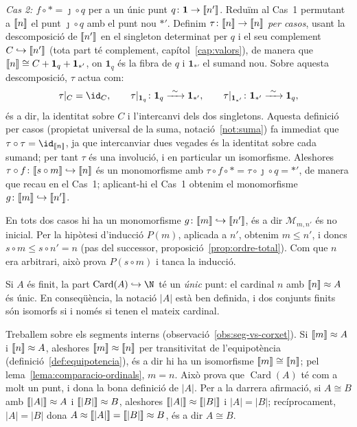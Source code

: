 \begin{prova}
\emph{Cas 2: \(f\circ\ast=\jmath\circ q\)} per a un únic punt
\(q\colon\mathbf1\to\llbracket n'\rrbracket\). Reduïm al Cas~1 permutant a \(\llbracket n\rrbracket\) el
punt \(\jmath\circ q\) amb el punt nou \(\ast'\). Definim
\(\tau\colon\llbracket n\rrbracket\to\llbracket n\rrbracket\) \emph{per casos}, usant la descomposició de
\(\llbracket n'\rrbracket\) en el singleton determinat per \(q\) i el seu complement
\(C\hookrightarrow\llbracket n'\rrbracket\) (tota part té complement,
capítol~\ref{cap:valors}), de manera que
\(\llbracket n\rrbracket\cong C+\mathbf1_q+\mathbf1_{\ast'}\), on \(\mathbf1_q\) és la
fibra de \(q\) i \(\mathbf1_{\ast'}\) el sumand nou. Sobre aquesta
descomposició, \(\tau\) actua com:
\[
\tau|_C=\id_C,
\qquad
\tau|_{\mathbf1_q}\colon\mathbf1_q\xrightarrow{\ \sim\ }\mathbf1_{\ast'},
\qquad
\tau|_{\mathbf1_{\ast'}}\colon\mathbf1_{\ast'}\xrightarrow{\ \sim\ }\mathbf1_q,
\]
és a dir, la identitat sobre \(C\) i l'intercanvi dels dos singletons.
Aquesta definició per casos (propietat universal de la suma,
notació~\ref{not:suma}) fa immediat que \(\tau\circ\tau=\id_{\seg{n}}\),
ja que intercanviar dues vegades és la identitat sobre cada sumand; per
tant \(\tau\) és una involució, i en particular un isomorfisme. Aleshores
\(\tau\circ f\colon\llbracket s\circ m\rrbracket\hookrightarrow\llbracket n\rrbracket\) és un
monomorfisme amb \(\tau\circ f\circ\ast=\tau\circ\jmath\circ
q=\ast'\), de manera que recau en el Cas~1; aplicant-hi el Cas~1 obtenim
el monomorfisme \(g\colon\llbracket m\rrbracket\hookrightarrow\llbracket n'\rrbracket\).

En tots dos casos hi ha un monomorfisme
\(g\colon\llbracket m\rrbracket\hookrightarrow\llbracket n'\rrbracket\), és a dir \(\mathcal M_{m,n'}\) és
no inicial. Per la hipòtesi d'inducció \(P(m)\), aplicada a \(n'\), obtenim
\(m\le n'\), i doncs \(s\circ m\le s\circ n'=n\) (pas del successor,
proposició~\ref{prop:ordre-total}). Com que \(n\) era arbitrari, això prova
\(P(s\circ m)\) i tanca la inducció.
\end{prova}

\begin{teorema}\label{teo:unicitat-cardinal}
Si \(A\) és finit, la part \(\operatorname{Card}(A)\hookrightarrow\N\) té un
\emph{únic} punt: el cardinal \(n\) amb \(\llbracket n\rrbracket\approx A\) és únic. En
conseqüència, la notació \(|A|\) està ben definida, i dos conjunts finits
són isomorfs si i només si tenen el mateix cardinal.
\end{teorema}

\begin{prova}
Treballem sobre els segments interns (observació~\ref{obs:seg-vs-corxet}).
Si \(\llbracket m\rrbracket\approx A\) i \(\llbracket n\rrbracket\approx A\), aleshores
\(\llbracket m\rrbracket\approx\llbracket n\rrbracket\) per transitivitat de l'equipotència
(definició~\ref{def:equipotencia}), és a dir hi ha un isomorfisme
\(\llbracket m\rrbracket\cong\llbracket n\rrbracket\); pel lema~\ref{lema:comparacio-ordinals}, \(m=n\).
Això prova que \(\operatorname{Card}(A)\) té com a molt un punt, i dona la
bona definició de \(|A|\). Per a la darrera afirmació, si \(A\cong B\) amb
\(\llbracket |A|\rrbracket\approx A\) i \(\llbracket |B|\rrbracket\approx B\), aleshores
\(\llbracket |A|\rrbracket\approx\llbracket |B|\rrbracket\) i \(|A|=|B|\); recíprocament, \(|A|=|B|\)
dona \(A\approx\llbracket |A|\rrbracket=\llbracket |B|\rrbracket\approx B\), és a dir \(A\cong B\).
\end{prova}

